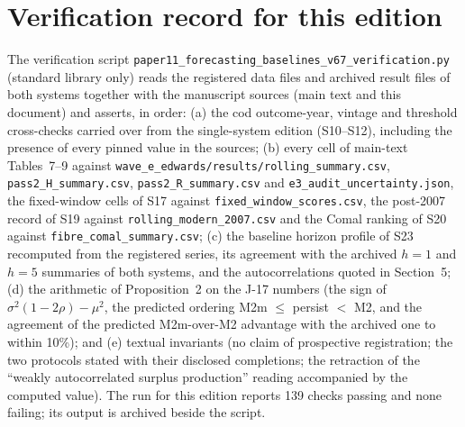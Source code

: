 \documentclass[preprint,11pt,authoryear]{elsarticle}
\theoremstyle{remark}
\begin{document}
\section{Verification record for this edition}\label{si:verify}

The verification script \texttt{paper11\_forecasting\_\allowbreak{}baselines\_v67\_\allowbreak{}verification.py} (standard library only) reads the registered data files and archived result files of both systems together with the manuscript sources (main text and this document) and asserts, in order: (a) the cod outcome-year, vintage and threshold cross-checks carried over from the single-system edition (S10--S12), including the presence of every pinned value in the sources; (b) every cell of main-text Tables~7--9 against \texttt{wave\_e\_edwards/results/rolling\_summary.csv}, \texttt{pass2\_H\_summary.csv}, \texttt{pass2\_R\_summary.csv} and \texttt{e3\_audit\_uncertainty.json}, the fixed-window cells of S17 against \texttt{fixed\_window\_scores.csv}, the post-2007 record of S19 against \texttt{rolling\_modern\_2007.csv} and the Comal ranking of S20 against \texttt{fibre\_comal\_summary.csv}; (c) the baseline horizon profile of S23 recomputed from the registered series, its agreement with the archived $h=1$ and $h=5$ summaries of both systems, and the autocorrelations quoted in Section~5; (d) the arithmetic of Proposition~2 on the J-17 numbers (the sign of $\sigma^2(1-2\rho)-\mu^2$, the predicted ordering M2m $\le$ persist $<$ M2, and the agreement of the predicted M2m-over-M2 advantage with the archived one to within 10\%); and (e) textual invariants (no claim of prospective registration; the two protocols stated with their disclosed completions; the retraction of the ``weakly autocorrelated surplus production'' reading accompanied by the computed value). The run for this edition reports 139 checks passing and none failing; its output is archived beside the script.
\end{document}
